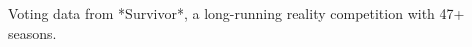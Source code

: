 \documentclass[preview]{standalone}
\begin{document}
Voting data from *Survivor*, a long-running reality competition with 47+ seasons.\\
\end{document}
